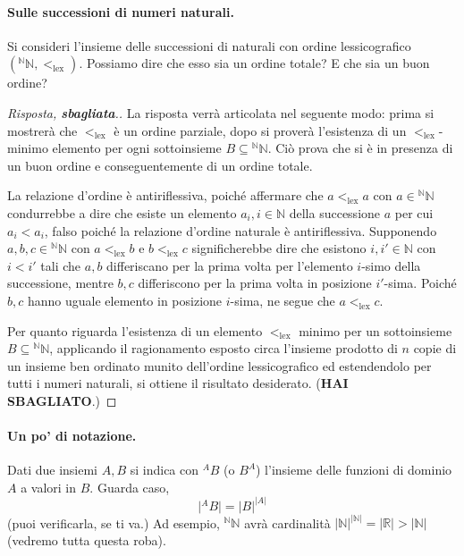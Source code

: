 \documentclass[fontsize = 11 pt, paper=A4, oneside, index=totoc, hyperref]{article}
\theoremstyle{definition}
\theoremstyle{plain}
\newcommand{\N}{\mathbb{N}}
\begin{document}
\paragraph{Sulle successioni di numeri naturali.} Si consideri l'insieme delle successioni di naturali con ordine lessicografico \(({}^\N\N, <_{\mathrm{lex}})\). Possiamo dire che esso sia un ordine totale? E che sia un buon ordine?
\begin{proof}[Risposta, {\bf sbagliata}.]
  La risposta verrà articolata nel seguente modo: prima si mostrerà che \(<_{\mathrm{lex}}\) è un ordine parziale, dopo si proverà l'esistenza di un \(<_{\mathrm{lex}}\)-minimo elemento per ogni sottoinsieme \(B \subseteq {}^\N\N\). Ciò prova che si è in presenza di un buon ordine e conseguentemente di un ordine totale.

  La relazione d'ordine è antiriflessiva, poiché affermare che \(a <_{\mathrm{lex}} a\) con \(a \in {}^\N\N\) condurrebbe a dire che esiste un elemento \(a_i, i \in \N\) della successione \(a\) per cui \(a_i < a_i\), falso poiché la relazione d'ordine naturale è antiriflessiva. Supponendo \(a,b,c \in {}^\N\N\) con \(a <_{\mathrm{lex}} b\) e \(b <_{\mathrm{lex}} c\) significherebbe dire che esistono \(i,i' \in \N\) con \(i < i'\) tali che \(a,b\) differiscano per la prima volta per l'elemento \(i\)-simo della successione, mentre \(b,c\) differiscono per la prima volta in posizione \(i'\)-sima. Poiché \(b,c\) hanno uguale elemento in posizione \(i\)-sima, ne segue che \(a <_{\mathrm{lex}} c\).

  Per quanto riguarda l'esistenza di un elemento \(<_{\mathrm{lex}}\) minimo per un sottoinsieme \(B \subseteq {}^\N\N\), applicando il ragionamento esposto circa l'insieme prodotto di \(n\) copie di un insieme ben ordinato munito dell'ordine lessicografico ed estendendolo per tutti i numeri naturali, si ottiene il risultato desiderato. ({\bf HAI SBAGLIATO}.)
\end{proof}

\paragraph{Un po' di notazione.} Dati due insiemi \(A,B\) si indica con \({}^AB\) (o \(B^A\)) l'insieme delle funzioni di dominio \(A\) a valori in \(B\). Guarda caso,
\[
\lvert {}^AB\rvert = \lvert B \rvert^{\lvert A \rvert}
\]
(puoi verificarla, se ti va.) Ad esempio, \({}^\N\N\) avrà cardinalità \(\lvert\N\rvert^{\lvert\N\lvert} = \lvert\mathbb{R}\rvert > \lvert\N\rvert\) (vedremo tutta questa roba).
\end{document}
